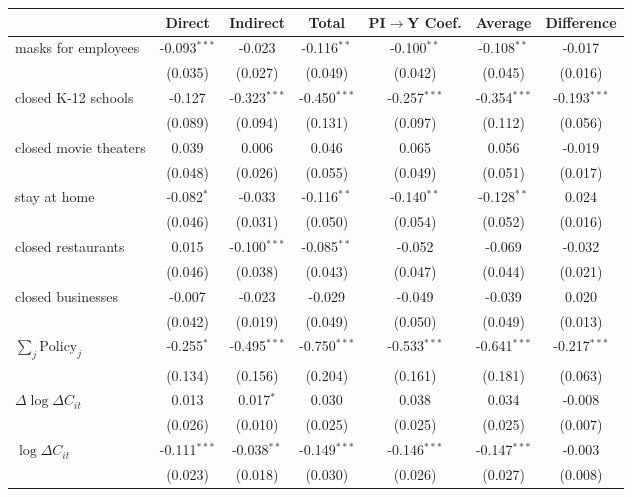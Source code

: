 
\begin{tabular}{lccccc|>{}c}
\toprule
  & Direct & Indirect & Total & PI$\to$Y Coef. & Average & Difference\\
\midrule
masks for employees & -0.093$^{***}$ & -0.023 & -0.116$^{**}$ & -0.100$^{**}$ & -0.108$^{**}$ & -0.017\\
 & (0.035) & (0.027) & (0.049) & (0.042) & (0.045) & (0.016)\\
closed K-12 schools & -0.127 & -0.323$^{***}$ & -0.450$^{***}$ & -0.257$^{***}$ & -0.354$^{***}$ & -0.193$^{***}$\\
 & (0.089) & (0.094) & (0.131) & (0.097) & (0.112) & (0.056)\\
closed movie theaters & 0.039 & 0.006 & 0.046 & 0.065 & 0.056 & -0.019\\
 & (0.048) & (0.026) & (0.055) & (0.049) & (0.051) & (0.017)\\
stay at home & -0.082$^{*}$ & -0.033 & -0.116$^{**}$ & -0.140$^{**}$ & -0.128$^{**}$ & 0.024\\
 & (0.046) & (0.031) & (0.050) & (0.054) & (0.052) & (0.016)\\
closed restaurants & 0.015 & -0.100$^{***}$ & -0.085$^{**}$ & -0.052 & -0.069 & -0.032\\
 & (0.046) & (0.038) & (0.043) & (0.047) & (0.044) & (0.021)\\
closed businesses & -0.007 & -0.023 & -0.029 & -0.049 & -0.039 & 0.020\\
 & (0.042) & (0.019) & (0.049) & (0.050) & (0.049) & (0.013)\\
$\sum_j \mathrm{Policy}_j$ & -0.255$^{*}$ & -0.495$^{***}$ & -0.750$^{***}$ & -0.533$^{***}$ & -0.641$^{***}$ & -0.217$^{***}$\\
 & (0.134) & (0.156) & (0.204) & (0.161) & (0.181) & (0.063)\\
$\Delta \log \Delta C_{it}$ & 0.013 & 0.017$^{*}$ & 0.030 & 0.038 & 0.034 & -0.008\\
 & (0.026) & (0.010) & (0.025) & (0.025) & (0.025) & (0.007)\\
$\log \Delta C_{it}$ & -0.111$^{***}$ & -0.038$^{**}$ & -0.149$^{***}$ & -0.146$^{***}$ & -0.147$^{***}$ & -0.003\\
 & (0.023) & (0.018) & (0.030) & (0.026) & (0.027) & (0.008)\\
\bottomrule
\end{tabular}